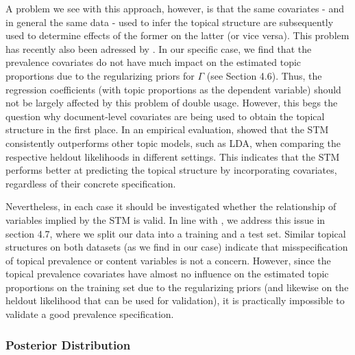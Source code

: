 A problem we see with this approach, however, is that the same covariates - and in general the same data - used to infer the topical structure are subsequently used to determine effects of the former on the latter (or vice versa). This problem has recently also been adressed by \cite{egami2018make}. In our specific case, we find that the prevalence covariates do not have much impact on the estimated topic proportions due to the regularizing priors for $\Gamma$ (see Section 4.6). Thus, the regression coefficients (with topic proportions as the dependent variable) should not be largely affected by this problem of double usage. However, this begs the question why document-level covariates are being used to obtain the topical structure in the first place. In an empirical evaluation, \cite{roberts2016model} showed that the STM consistently outperforms other topic models, such as LDA, when comparing the respective heldout likelihoods in different settings. This indicates that the STM performs better at predicting the topical structure by incorporating covariates, regardless of their concrete specification.

Nevertheless, in each case it should be investigated whether the relationship of variables implied by the STM is valid. In line with \cite{egami2018make}, we address this issue in section 4.7, where we split our data into a training and a test set. Similar topical structures on both datasets (as we find in our case) indicate that misspecification of topical prevalence or content variables is not a concern. However, since the topical prevalence covariates have almost no influence on the estimated topic proportions on the training set due to the regularizing priors (and likewise on the heldout likelihood that can be used for validation), it is practically impossible to validate a good prevalence specification.

\subsubsection*{Posterior Distribution}

